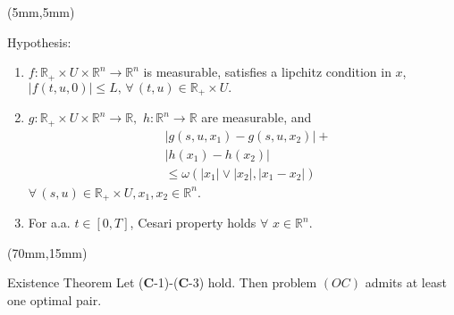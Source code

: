 \begin{frame}[plain]
	\begin{textblock*}{60mm}(5mm,5mm)
		\begin{graybox}{Hypothesis:}
			\begin{enumerate}[(\textbf{{C}}-1)]
				\item
					$
					f:\mathbb{R}_{+}\times U
					\times \mathbb{R}^n\rightarrow 
					\mathbb{R}^n
					$ is measurable, satisfies a lipchitz
					condition in $x$,
					$
					|f(t,u,0)|\leq L,\,
					\forall\,(t,u)\in
					\mathbb{R}_{+}\times U .
					$
				\item
					$
					g:\mathbb{R}_{+}\times U\times 
					\mathbb{R}^n\rightarrow \mathbb{R},
					$ 
					$
					h:\mathbb{R}^n\rightarrow \mathbb{R}
					$ are measurable, and
					\begin{align*}
					&|g(s,u,x_1)-g(s,u,x_2)|+\\
					&|h(x_1)-h(x_2)|\\
					&\leq \omega(|x_1|\vee |x_2|,|x_1-x_2|)
					\end{align*}
					$
					\forall\, (s,u)\in \mathbb{R}_{+}
					\times U,x_1,x_2\in \mathbb{R}^n
					$.
				\item
					For a.a. $t\in[0,T]$, Cesari property holds $\forall$ $x\in \mathbb{R}^n$.
			\end{enumerate}	
		\end{graybox}
	\end{textblock*}


	
	\begin{textblock*}{55mm}(70mm,15mm)
		\begin{graybox}{Existence Theorem}
			Let ($\mathbf{C}$-1)-($\mathbf{C}$-3) hold. Then problem $(OC)$ admits at least one optimal pair.
		\end{graybox}
	\end{textblock*}
\end{frame}

